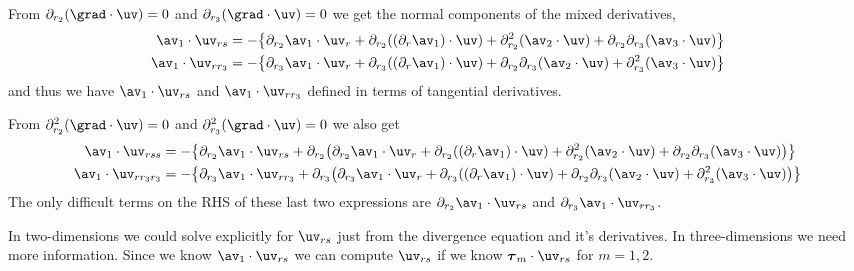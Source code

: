 \documentclass[10pt]{article}
\newcommand{\rc}{{r_3}}%
\begin{document}
From $\prb(\grad\cdot\uv)=0$ and $\prc(\grad\cdot\uv)=0$ we get the normal components of the
mixed derivatives,
\begin{align*}
  \av_1\cdot\uv_{rs} &= -\big\{ \prb\av_1\cdot\uv_r + \prb( (\partial_r\av_1)\cdot\uv )
                + \prb^2(\av_2\cdot\uv)+\prb\prc(\av_3\cdot\uv)\big\} \\
  \av_1\cdot\uv_{r\rc} &= -\big\{ \prc\av_1\cdot\uv_r + \prc( (\partial_r\av_1)\cdot\uv )
               + \prb\prc(\av_2\cdot\uv)+\prc^2(\av_3\cdot\uv)\big\} \\
\end{align*}
and thus we have $\av_1\cdot\uv_{rs}$ and $\av_1\cdot\uv_{r\rc}$ defined in terms of tangential derivatives.

From $\prb^2(\grad\cdot\uv)=0$ and $\prc^2(\grad\cdot\uv)=0$ we also get 
\begin{align*}
  \av_1\cdot\uv_{rss} &= -\big\{ \prb\av_1\cdot\uv_{rs} +
            \prb\big( \prb\av_1\cdot\uv_r + \prb( (\partial_r\av_1)\cdot\uv )
                  + \prb^2(\av_2\cdot\uv)+\prb\prc(\av_3\cdot\uv) \big) \big\} \\
  \av_1\cdot\uv_{r\rc\rc} &= -\big\{ \prc\av_1\cdot\uv_{r\rc} +
                \prc\big(  \prc\av_1\cdot\uv_r + \prc( (\partial_r\av_1)\cdot\uv )
                   + \prb\prc(\av_2\cdot\uv)+\prc^2(\av_3\cdot\uv) \big) \big\} \\
\end{align*}
The only difficult terms on the RHS of these
 last two expressions are $\prb\av_1\cdot\uv_{rs}$ and $\prc\av_1\cdot\uv_{r\rc}$.

In two-dimensions we could solve explicitly for $\uv_{rs}$ just from the divergence equation and it's derivatives.
In three-dimensions we need more information. Since we know $\av_1\cdot\uv_{rs}$ we can compute
$\uv_{rs}$ if we know $\tauv_m\cdot\uv_{rs}$ for $m=1,2$.
\end{document}
